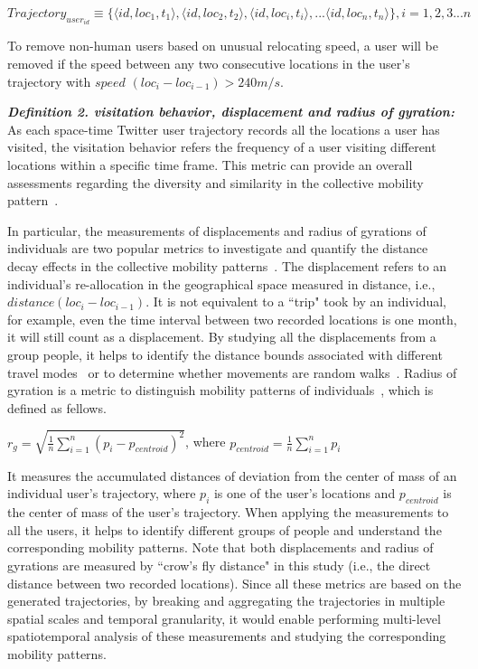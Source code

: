 \documentclass[a4paper, 11pt]{article}
\begin{document}
$Trajectory_{user_{id}} \equiv \lbrace \langle id, loc_{1}, t_{1}\rangle, \langle id, loc_{2}, t_{2}\rangle, \langle id, loc_{i}, t_{i}\rangle, ... \langle id, loc_{n}, t_{n}\rangle \rbrace, i = 1, 2, 3...n$
\newline

To remove non-human users based on unusual relocating speed, a user will be removed if the speed between any two consecutive locations in the user's trajectory with $speed$ $(loc_{i} - loc_{i-1}) > 240 m/s $.
\newline

\noindent\emph{\textbf{Definition 2. visitation behavior, displacement and radius of gyration:}} As each space-time Twitter user trajectory records all the locations a user has visited, the visitation behavior refers the frequency of a user visiting different locations within a specific time frame.
This metric can provide an overall assessments regarding the diversity and similarity in the collective mobility pattern~\citep{gao2012exploring}.

In particular, the measurements of displacements and radius of gyrations of individuals are two popular metrics to investigate and quantify the distance decay effects in the collective mobility patterns~\citep{gonzalez2008understanding}.
The displacement refers to an individual's re-allocation in the geographical space measured in distance, i.e., $distance (loc_{i} - loc_{i-1})$. It is not equivalent to a ``trip" took by an individual, for example, even the time interval between two recorded locations is one month, it will still count as a displacement.  
By studying all the displacements from a group people, it helps to identify the distance bounds associated with different travel modes~\citep{Jurdak2015} or to determine whether movements are random walks~\citep{brockmann2006scaling}.
Radius of gyration is a metric to distinguish mobility patterns of individuals~\citep{gonzalez2008understanding}, which is defined as fellows.   
\newline

$r_{g} = \sqrt{\frac{1}{n}\sum_{i=1}^{n}(p_{i} -  p_{centroid})^{2}}$, where $p_{centroid} = \frac{1}{n}\sum_{i=1}^{n}p_{i}$
\newline

\noindent It measures the accumulated distances of deviation from the center of mass of an individual user's trajectory, where $p_{i}$ is one of the user's locations and $p_{centroid}$ is the center of mass of the user's trajectory. When applying the measurements to all the users, it helps to identify different groups of people and understand the corresponding mobility patterns. Note that both displacements and radius of gyrations are measured by ``crow's fly distance" in this study (i.e., the direct distance between two recorded locations).
Since all these metrics are based on the generated trajectories, by breaking and aggregating the trajectories in multiple spatial scales and temporal granularity, it would enable performing multi-level spatiotemporal analysis of these measurements and studying the corresponding mobility patterns. 
\end{document}
